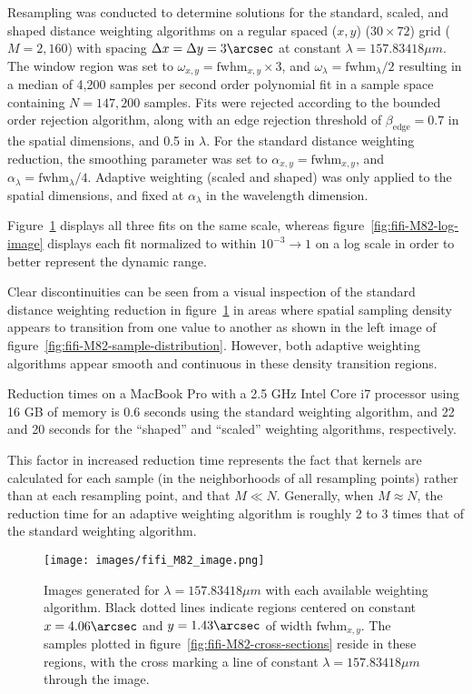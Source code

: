 Resampling was conducted to determine solutions for the standard, scaled, and
shaped distance weighting algorithms on a regular spaced ($x, y$)
($30 \times 72$) grid ($M=2,160$) with  spacing $\Delta x = \Delta y = 3\arcsec$
at constant $\lambda=157.83418\mu m$.
The window region was set to $\omega_{x,y}=\text{fwhm}_{x,y} \times 3$, and
$\omega_{\lambda} =\text{fwhm}_{\lambda} / 2$ resulting in a median of
4,200 samples per second order polynomial fit in a sample space containing
$N=147,200$ samples.
Fits were rejected according to the bounded order rejection algorithm, along
with an edge rejection threshold of $\beta_{\text{edge}} = 0.7$ in the spatial
dimensions, and 0.5 in $\lambda$.
For the standard distance weighting reduction, the smoothing parameter was
set to $\alpha_{x,y} = \text{fwhm}_{x,y}$, and
$\alpha_{\lambda} = \text{fwhm}_{\lambda} / 4$.
Adaptive weighting (scaled and shaped) was only applied to the spatial
dimensions, and fixed at $\alpha_{\lambda}$ in the wavelength dimension.

Figure~\ref{fig:fifi-M82-image} displays all three fits on the same scale,
whereas figure~\ref{fig:fifi-M82-log-image} displays each fit normalized to
within $10^{-3} \to 1$ on a log scale in order to better represent the
dynamic range.

Clear discontinuities can be seen from a visual inspection of the standard
distance weighting reduction in figure~\ref{fig:fifi-M82-image} in areas
where spatial sampling density appears to transition from one value to
another as shown in the left image of
figure~\ref{fig:fifi-M82-sample-distribution}.
However, both adaptive weighting algorithms appear smooth and continuous
in these density transition regions.

Reduction times on a MacBook Pro with a 2.5 GHz Intel Core i7 processor using
16 GB of memory is 0.6 seconds using the standard weighting algorithm, and
22 and 20 seconds for the ``shaped'' and ``scaled'' weighting algorithms,
respectively.

This factor in increased reduction time represents the fact that kernels are
calculated for each sample (in the neighborhoods of all resampling points)
rather than at each resampling point, and that $M \ll N$.
Generally, when $M \approx N$, the reduction time for an adaptive weighting
algorithm is roughly 2 to 3 times that of the standard weighting algorithm.

\begin{figure}[H]
  \begin{center}
  \texttt{[image: images/fifi\_M82\_image.png]}
  \caption{Images generated for $\lambda=157.83418\mu m$ with each available
           weighting algorithm.  Black dotted lines indicate regions centered
           on constant $x=4.06\arcsec$ and $y=1.43\arcsec$ of
           width $\text{fwhm}_{x,y}$.  The samples plotted in
           figure~\ref{fig:fifi-M82-cross-sections} reside in these regions,
           with the cross marking a line of constant $\lambda=157.83418\mu m$ through
           the image.}
  \label{fig:fifi-M82-image}
  \end{center}
\end{figure}

